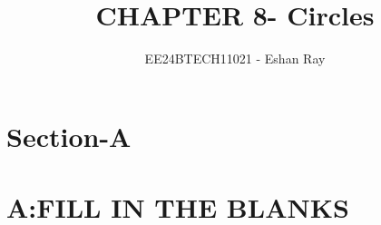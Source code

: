 \documentclass[journal,12pt,twocolumn]{IEEEtran}
\begin{document}


\vspace{3cm}

\title{CHAPTER 8- Circles}
\author{EE24BTECH11021 - Eshan Ray}
\maketitle
\newpage
\bigskip

\renewcommand{\thefigure}{\theenumi}
\renewcommand{\thetable}{\theenumi}


\section*{Section-A }
\section*{A:FILL IN THE BLANKS}
\end{document}
